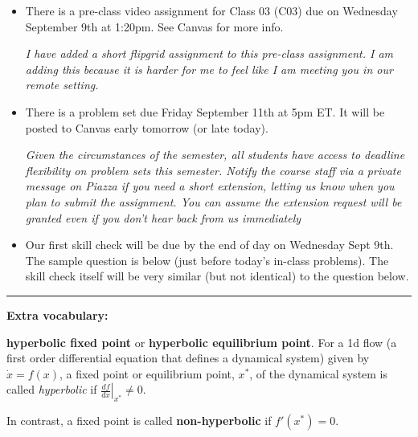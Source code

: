 \documentclass[12pt,letterpaper,noanswers]{exam}
\begin{document}
 \pdfpageheight 11in 
  \pdfpagewidth 8.5in



\begin{itemize}
    \item There is a pre-class video assignment for Class 03 (C03) due on Wednesday September 9th at 1:20pm.  See Canvas for more info.  
    
    \emph{I have added a short flipgrid assignment to this pre-class assignment.  I am adding this because it is harder for me to feel like I am meeting you in our remote setting.}
    \item There is a problem set due Friday September 11th at 5pm ET.  It will be posted to Canvas early tomorrow (or late today).
    
    \emph{Given the circumstances of the semester, all students have access to deadline flexibility on problem sets this semester.  Notify the course staff via a private message on Piazza if you need a short extension, letting us know when you plan to submit the assignment.  You can assume the extension request will be granted even if you don't hear back from us immediately}
    \item Our first skill check will be due by the end of day on Wednesday Sept 9th.  The sample question is below (just before today's in-class problems).  The skill check itself will be very similar (but not identical) to the question below.
\end{itemize}

\hrule
\vspace{0.2cm}




\noindent \textbf{Extra vocabulary:}
\begin{tcolorbox}
\textbf{hyperbolic fixed point} or \textbf{hyperbolic equilibrium point}. For a 1d flow (a first order differential equation that defines a dynamical system) given by $\dot x = f(x)$, a fixed point or equilibrium point, $x^*$, of the dynamical system is called \emph{hyperbolic} if  $\left.\frac{df}{dx}\right\vert_{x^*} \neq 0$.

In contrast, a fixed point is called \textbf{non-hyperbolic} if $f'(x^*) = 0$.

\end{tcolorbox}
\end{document}
